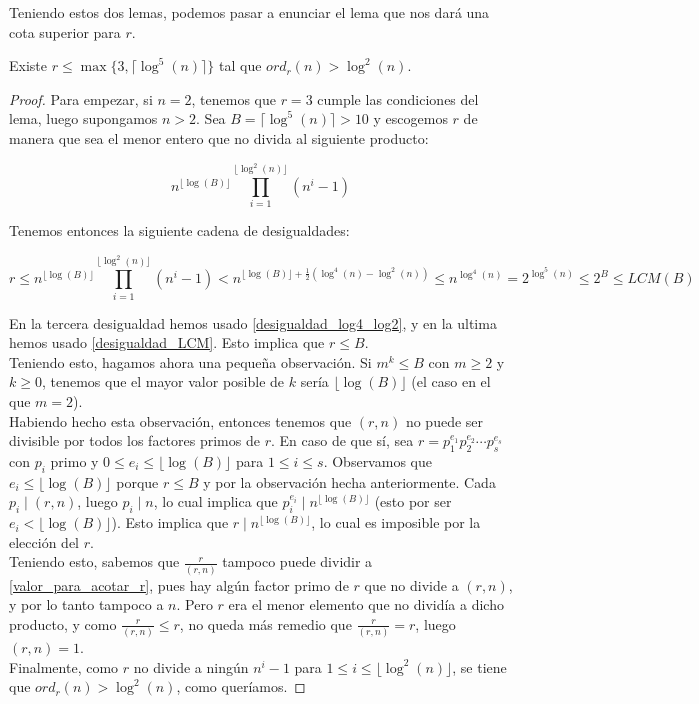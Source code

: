 Teniendo estos dos lemas, podemos pasar a enunciar el lema que nos dará una cota superior para $r$.

\begin{lema}\label{cota_superior_r_log5}
	Existe $r \leq \max\{3, \lceil \log^5(n) \rceil \}$ tal que $ord_r(n) > \log^2(n)$.
\end{lema}

\begin{proof}
	Para empezar, si $n = 2$, tenemos que $r = 3$ cumple las condiciones del lema, luego supongamos $n > 2$. Sea $B = \lceil \log^5(n) \rceil > 10$ y escogemos $r$ de manera que sea el menor entero que no divida al siguiente producto:
		
	\begin{equation}\label{valor_para_acotar_r}
	n^{\lfloor \log(B) \rfloor}\prod_{i=1}^{\lfloor \log^2(n) \rfloor}(n^i - 1)
	\end{equation}
	
	Tenemos entonces la siguiente cadena de desigualdades:
	
	\[ r \leq n^{\lfloor \log(B) \rfloor}\prod_{i=1}^{\lfloor \log^2(n) \rfloor}(n^i - 1) < n^{\lfloor \log(B) \rfloor + \frac{1}{2}(\log^4(n) - \log^2(n))} \leq n^{\log^4(n)} = 2^{\log^5(n)} \leq 2^B \leq LCM(B) \]
	
	En la tercera desigualdad hemos usado \autoref{desigualdad_log4_log2}, y en la ultima hemos usado \autoref{desigualdad_LCM}. Esto implica que $r \leq B$.\\
	
	Teniendo esto, hagamos ahora una pequeña observación. Si $m^k \leq B$ con $m \geq 2$ y $k \geq 0$, tenemos que el mayor valor posible de $k$ sería $\lfloor \log(B) \rfloor$ (el caso en el que $m = 2$).\\
	
	Habiendo hecho esta observación, entonces tenemos que $(r, n)$ no puede ser divisible por todos los factores primos de $r$. En caso de que sí, sea $r = p_1^{e_1}p_2^{e_2}\dotsm p_s^{e_s}$ con $p_i$ primo y $0 \leq e_i \leq \lfloor \log(B) \rfloor$ para $1 \leq i \leq s$. Observamos que $e_i \leq \lfloor \log(B) \rfloor$ porque $r \leq B$ y por la observación hecha anteriormente. Cada $p_i \mid (r, n)$, luego $p_i \mid n$, lo cual implica que $p_i^{e_i} \mid n^{\lfloor \log(B) \rfloor}$ (esto por ser $e_i < \lfloor \log(B) \rfloor$). Esto implica que $r \mid n^{\lfloor \log(B) \rfloor}$, lo cual es imposible por la elección del $r$.\\
	
	Teniendo esto, sabemos que $\frac{r}{(r, n)}$ tampoco puede dividir a \eqref{valor_para_acotar_r}, pues hay algún factor primo de $r$ que no divide a $(r, n)$, y por lo tanto tampoco a $n$. Pero $r$ era el menor elemento que no dividía a dicho producto, y como $\frac{r}{(r, n)} \leq r$, no queda más remedio que $\frac{r}{(r, n)} = r$, luego $(r, n) = 1$.\\
	
	Finalmente, como $r$ no divide a ningún $n^i - 1$ para $1 \leq i \leq \lfloor \log^2(n) \rfloor$, se tiene que $ord_r(n) > \log^2(n)$, como queríamos.
\end{proof}

